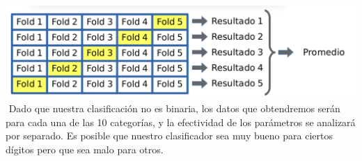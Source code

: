 {\centering
    \includegraphics[scale=0.30]{informe/imagenes/kfold/kfoldEjemplo2.png} \\
}
$ $\newline
Dado que nuestra clasificación no es binaria, los datos que obtendremos serán para cada una de las 10 categorías, y la efectividad de los parámetros se analizará por separado. Es posible que nuestro clasificador sea muy bueno para ciertos dígitos pero que sea malo para otros. \\



